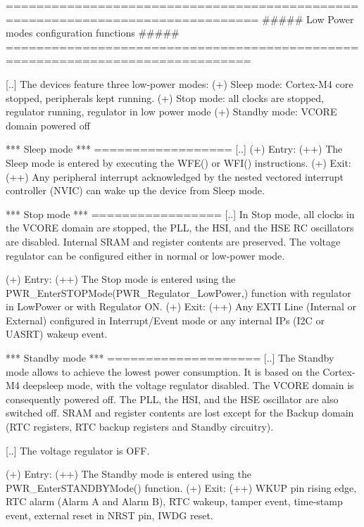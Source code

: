 \begin{DoxyVerb} ===============================================================================
              ##### Low Power modes configuration functions #####
  ==============================================================================

    [..] The devices feature three low-power modes:
    (+) Sleep mode: Cortex-M4 core stopped, peripherals kept running.
    (+) Stop mode: all clocks are stopped, regulator running, regulator in low power mode
    (+) Standby mode: VCORE domain powered off

  *** Sleep mode *** 
  ==================
  [..] 
    (+) Entry:
        (++) The Sleep mode is entered by executing the WFE() or WFI() instructions.
    (+) Exit:
        (++) Any peripheral interrupt acknowledged by the nested vectored interrupt 
             controller (NVIC) can wake up the device from Sleep mode.

  *** Stop mode *** 
  =================
  [..] In Stop mode, all clocks in the VCORE domain are stopped, the PLL, the HSI,
       and the HSE RC oscillators are disabled. Internal SRAM and register 
       contents are preserved.
       The voltage regulator can be configured either in normal or low-power mode.

    (+) Entry:
        (++) The Stop mode is entered using the PWR_EnterSTOPMode(PWR_Regulator_LowPower,) 
             function with regulator in LowPower or with Regulator ON.
    (+) Exit:
        (++) Any EXTI Line (Internal or External) configured in Interrupt/Event mode
             or any internal IPs (I2C or UASRT) wakeup event.

  *** Standby mode *** 
  ====================
  [..] The Standby mode allows to achieve the lowest power consumption. It is based 
       on the Cortex-M4 deepsleep mode, with the voltage regulator disabled. 
       The VCORE domain is consequently powered off. The PLL, the HSI, and the HSE 
       oscillator are also switched off. SRAM and register 
       contents are lost except for the Backup domain (RTC registers, RTC backup 
       registers and Standby circuitry).
   
  [..] The voltage regulator is OFF.

    (+) Entry:
        (++) The Standby mode is entered using the PWR_EnterSTANDBYMode() function.
    (+) Exit:
        (++) WKUP pin rising edge, RTC alarm (Alarm A and Alarm B), RTC wakeup,
             tamper event, time-stamp event, external reset in NRST pin, IWDG reset.


\end{DoxyVerb}
